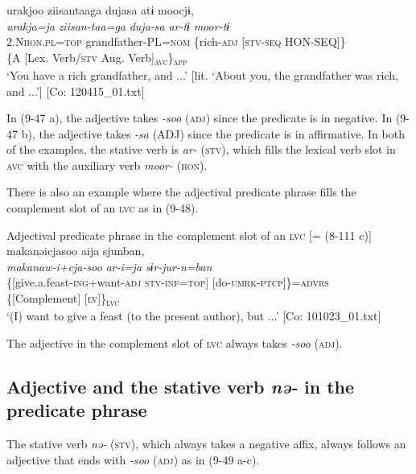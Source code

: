 \ex \label{ex:9.47b} %
    \gllll  urakjoo  ziisantaaga  dujasa  atɨ   moocjɨ,\\
      \textit{urakja=ja}  \textit{ziisan-taa=ga}  \textit{duja-sa}  \textit{ar-tɨ}  \textit{moor-tɨ}\\
      2.N\textsc{hon}.\textsc{pl}=\textsc{top}  grandfather-PL=\textsc{nom}  \{rich-\textsc{adj}  [\textsc{stv}-\textsc{seq}  HON-SEQ]\}\\
      {}   {} {\{A}  {[Lex. Verb/\textsc{stv}}   {Aug. Verb]\textsubscript{\textsc{avc}}\}\textsubscript{\textsc{app}}}\\
      \glt       ‘You have a rich grandfather, and ...’ [lit. ‘About you, the grandfather was rich, and ...’] [Co: 120415\_01.txt]
    \z
\z

In (9-47 a), the adjective takes \textit{{}-soo} (\textsc{adj}) since the predicate is in negative. In (9-47 b), the adjective takes \textit{{}-sa} (ADJ) since the predicate is in affirmative. In both of the examples, the stative verb is \textit{ar-} (\textsc{stv}), which fills the lexical verb slot in \textsc{avc} with the auxiliary verb \textit{moor-} (\textsc{hon}).

There is also an example where the adjectival predicate phrase fills the complement slot of an \textsc{lvc} as in (9-48).

\ea   Adjectival predicate phrase in the complement slot of an \textsc{lvc} [= (8-111 c)] \label{ex:9.48}
 \gllll  makanəicjasoo  aija  sjunban,\\
    \textit{makanaw-i+cja-soo}  \textit{ar-i=ja}  \textit{sɨr-jur-n=ban}\\
    \{[give.a.feast-\textsc{ing}+want-\textsc{adj}  \textsc{stv}-\textsc{inf}=\textsc{top}]  [do-\textsc{umrk}-\textsc{ptcp}]\}=\textsc{advrs}\\
    \{[Complement]  {}  [\textsc{lv}]\}\textsubscript{\textsc{lvc}}\\
    \glt     ‘(I) want to give a feast (to the present author), but ...’ [Co: 101023\_01.txt]
\z

The adjective in the complement slot of \textsc{lvc} always takes \textit{{}-soo} (\textsc{adj}).

\subsection{Adjective and the stative verb \textit{nə-} in the predicate phrase}\label{sec:9.2.3}

The stative verb \textit{nə-} (\textsc{stv}), which always takes a negative affix, always follows an adjective that ends with \textit{{}-soo} (\textsc{adj}) as in (9-49 a-c).

